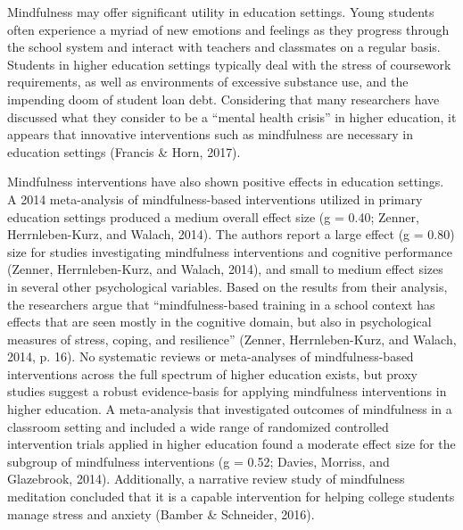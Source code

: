 \documentclass[10pt]{article}
\begin{document}
Mindfulness may offer significant utility in education settings. Young
students often experience a myriad of new emotions and feelings as they
progress through the school system and interact with teachers and
classmates on a regular basis. Students in higher education settings
typically deal with the stress of coursework requirements, as well as
environments of excessive substance use, and the impending doom of
student loan debt. Considering that many researchers have discussed what
they consider to be a ``mental health crisis'' in higher education, it
appears that innovative interventions such as mindfulness are necessary
in education settings (Francis \& Horn, 2017).

Mindfulness interventions have also shown positive effects in education
settings. A 2014 meta-analysis of mindfulness-based interventions
utilized in primary education settings produced a medium overall effect
size (g = 0.40; Zenner, Herrnleben-Kurz, and Walach, 2014). The authors
report a large effect (g = 0.80) size for studies investigating
mindfulness interventions and cognitive performance (Zenner,
Herrnleben-Kurz, and Walach, 2014), and small to medium effect sizes in
several other psychological variables. Based on the results from their
analysis, the researchers argue that ``mindfulness-based training in a
school context has effects that are seen mostly in the cognitive domain,
but also in psychological measures of stress, coping, and resilience''
(Zenner, Herrnleben-Kurz, and Walach, 2014, p. 16). No systematic
reviews or meta-analyses of mindfulness-based interventions across the
full spectrum of higher education exists, but proxy studies suggest a
robust evidence-basis for applying mindfulness interventions in higher
education. A meta-analysis that investigated outcomes of mindfulness in
a classroom setting and included a wide range of randomized controlled
intervention trials applied in higher education found a moderate effect
size for the subgroup of mindfulness interventions (g = 0.52; Davies,
Morriss, and Glazebrook, 2014). Additionally, a narrative review study
of mindfulness meditation concluded that it is a capable intervention
for helping college students manage stress and anxiety (Bamber \&
Schneider, 2016).
\end{document}
